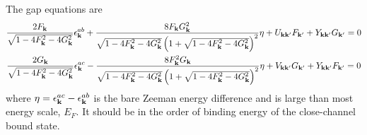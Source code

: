 The gap equations are 
\begin{subequations}\label{eq:20100909:fullgap}
\begin{gather}
\frac{2F_{\mathbf{k}}}{\sqrt{1-4 F_{\mathbf{k}}^2-4 G_{\mathbf{k}}^2}} \epsilon^{ab}_{\mathbf{k}}+\frac{8 F_{\mathbf{k}} G_{\mathbf{k}}^2}{\sqrt{1-4 F_{\mathbf{k}}^2-4 G_{\mathbf{k}}^2} \left(1+\sqrt{1-4 F_{\mathbf{k}}^2-4 G_{\mathbf{k}}^2}\right)^2}\eta+U_{\mathbf{k}\mathbf{k}'}F_{\mathbf{k}'}+Y_{\mathbf{k}\mathbf{k}'}G_{\mathbf{k}'}=0
\label{eq:20100909:fullgapa}\\
\frac{2G_{\mathbf{k}}}{\sqrt{1-4 F_{\mathbf{k}}^2-4 G_{\mathbf{k}}^2}} \epsilon^{ac}_{\mathbf{k}}-\frac{8 F_{\mathbf{k}}^{2} G_{\mathbf{k}}}{\sqrt{1-4 F_{\mathbf{k}}^2-4 G_{\mathbf{k}}^2} \left(1+\sqrt{1-4 F_{\mathbf{k}}^2-4 G_{\mathbf{k}}^2}\right)^2}\eta+V_{\mathbf{k}\mathbf{k}'}G_{\mathbf{k}'}+Y_{\mathbf{k}\mathbf{k}'}F_{\mathbf{k}'}=0
\label{eq:20100909:fullgapb}
\end{gather}
\end{subequations}
where $\eta=\epsilon^{ac}_{\mathbf{k}}-\epsilon^{ab}_{\mathbf{k}}$ is the bare Zeeman energy difference and is large than most energy scale, $E_{F}$.  It should be in the order of binding energy of the close-channel bound state.    
